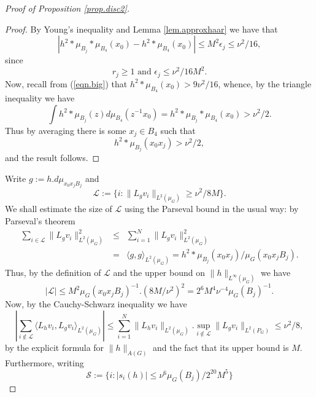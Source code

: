 \documentclass[12pt]{amsart}
\numberwithin{equation}{section}
\theoremstyle{plain}
\theoremstyle{definition}
\renewcommand{\leq}{\leqslant}
\renewcommand{\geq}{\geqslant}
\begin{document}
\begin{proof}[Proof of Proposition \ref{prop.disc2}]
\begin{proof}
By Young's inequality and Lemma \ref{lem.approxhaar} we have that
\begin{equation*}
|h^2 \ast \mu_{B_j} \ast \mu_{B_4}(x_0)-h^2 \ast \mu_{B_4}(x_0)| \leq M^2\epsilon_j \leq \nu^2/16,
\end{equation*}
since
\begin{equation*}
r_j \geq 1 \textrm{ and } \epsilon_j \leq \nu^2/16M^2.
\end{equation*}
Now, recall from (\ref{eqn.big}) that $h^2 \ast \mu_{B_4}(x_0) > 9\nu^2/16$, whence, by the triangle inequality we have
\begin{equation*}
\int{h^2 \ast \mu_{B_j}(z) d\mu_{B_4}(z^{-1}x_0)}=h^2   \ast \mu_{B_j} \ast \mu_{B_4}(x_0)> \nu^2/2.
\end{equation*}
Thus by averaging there is some $x_j \in B_4$ such that
\begin{equation*}
h^2\ast \mu_{B_j}(x_0x_j)> \nu^2/2,
\end{equation*}
and the result follows.
\end{proof}
Write $g:=h.d\mu_{x_0x_jB_j}$ and
\begin{equation*}
\mathcal{L}:=\{i: \|L_gv_i\|_{L^2(\mu_G)}\geq \nu^2/8M\}.
\end{equation*}
We shall estimate the size of $\mathcal{L}$ using the Parseval bound in the usual way: by Parseval's theorem
\begin{eqnarray*}
\sum_{i \in \mathcal{L}}{\|L_gv_i\|_{L^2(\mu_G)}^2} & \leq & \sum_{i=1 }^N{\|L_gv_i\|_{L^2(\mu_G)}^2} \\ & = & \langle g,g\rangle_{L^2(\mu_G)} = h^2\ast \mu_{B_j}(x_0x_j)/\mu_G(x_0x_jB_j).
\end{eqnarray*}
Thus, by the definition of $\mathcal{L}$ and the upper bound on $\|h\|_{L^\infty(\mu_G)}$ we have
\begin{equation*}
|\mathcal{L}| \leq M^2\mu_G(x_0x_jB_j)^{-1}.(8M/\nu^2)^2 = 2^{6}M^4\nu^{-4}\mu_G(B_j)^{-1}.
\end{equation*}
Now, by the Cauchy-Schwarz inequality we have
\begin{equation}\label{eqn.ce1}
 |\sum_{i\not \in \mathcal{L}}{\langle L_hv_i,L_gv_i\rangle_{L^2(\mu_G)}}|  \leq  \sum_{i=1}^N{\|L_hv_i\|_{L^2(\mu_G)}}.\sup_{i \not \in \mathcal{L}}\|L_gv_i\|_{L^2(P_G)}\leq  \nu^2/8,
\end{equation}
by the explicit formula for $\|h\|_{A(G)}$ and the fact that its upper bound is $M$.  Furthermore, writing 
\begin{equation*}
\mathcal{S}:=\{i:  |s_i(h)| \leq \nu^6\mu_G(B_{j})/2^{20}M^5\}

\end{equation*}
\end{proof}
\end{document}
